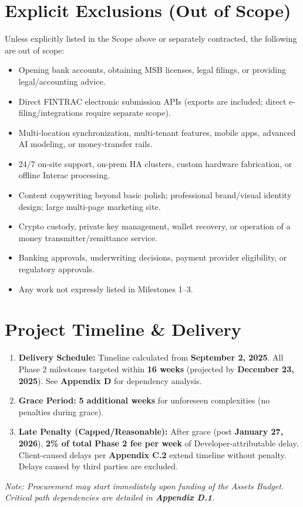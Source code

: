 \documentclass[11pt, a4paper]{article}
\begin{document}
\section{Explicit Exclusions (Out of Scope)}
\label{sec:exclusions}
Unless explicitly listed in the Scope above or separately contracted, the following are out of scope:
\begin{itemize}[leftmargin=*]
  \item Opening bank accounts, obtaining MSB licenses, legal filings, or providing legal/accounting advice.
  \item Direct FINTRAC electronic submission APIs (exports are included; direct e-filing/integrations require separate scope).
  \item Multi-location synchronization, multi-tenant features, mobile apps, advanced AI modeling, or money-transfer rails.
  \item 24/7 on-site support, on-prem HA clusters, custom hardware fabrication, or offline Interac processing.
  \item Content copywriting beyond basic polish; professional brand/visual identity design; large multi-page marketing site.
  \item Crypto custody, private key management, wallet recovery, or operation of a money transmitter/remittance service.
  \item Banking approvals, underwriting decisions, payment provider eligibility, or regulatory approvals.
  \item Any work not expressly listed in Milestones 1–3.
\end{itemize}

\section{Project Timeline \& Delivery}
\begin{enumerate}
  \item \textbf{Delivery Schedule:} Timeline calculated from \textbf{September 2, 2025}. All Phase 2 milestones targeted within \textbf{16 weeks} (projected by \textbf{December 23, 2025}). See \textbf{Appendix D} for dependency analysis.
  \item \textbf{Grace Period:} \textbf{5 additional weeks} for unforeseen complexities (no penalties during grace).
  \item \textbf{Late Penalty (Capped/Reasonable):} After grace (post \textbf{January 27, 2026}), \textbf{2\% of total Phase 2 fee per week} of Developer-attributable delay. Client-caused delays per \textbf{Appendix C.2} extend timeline without penalty. Delays caused by third parties are excluded.
\end{enumerate}
\textit{Note: Procurement may start immediately upon funding of the Assets Budget. Critical path dependencies are detailed in \textbf{Appendix D.1}.}
\end{document}
